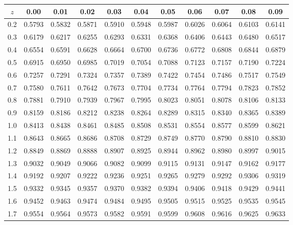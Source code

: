 \documentclass[11pt]{article}
\renewcommand{\arraystretch}{1.02}
\begin{document}
	
	\begin{center}
		\renewcommand{\arraystretch}{1.18}
		\setlength{\tabcolsep}{10.2pt}
		\begin{tabular}{|c|c|c|c|c|c|c|c|c|c|c|}
			\hline
			\rowcolor{gray!40}
			\(z\) & 0.00 & 0.01 & 0.02 & 0.03 & 0.04 & 0.05 & 0.06 & 0.07 & 0.08 & 0.09\\
			\hline
			0.2 & 0.5793 & 0.5832 & 0.5871 & 0.5910 & 0.5948 & 0.5987 & 0.6026 & 0.6064 & 0.6103 & 0.6141\\
			0.3 & 0.6179 & 0.6217 & 0.6255 & 0.6293 & 0.6331 & 0.6368 & 0.6406 & 0.6443 & 0.6480 & 0.6517\\
			0.4 & 0.6554 & 0.6591 & 0.6628 & 0.6664 & 0.6700 & 0.6736 & 0.6772 & 0.6808 & 0.6844 & 0.6879\\
			0.5 & 0.6915 & 0.6950 & 0.6985 & 0.7019 & 0.7054 & 0.7088 & 0.7123 & 0.7157 & 0.7190 & 0.7224\\
			0.6 & 0.7257 & 0.7291 & 0.7324 & 0.7357 & 0.7389 & 0.7422 & 0.7454 & 0.7486 & 0.7517 & 0.7549\\
			0.7 & 0.7580 & 0.7611 & 0.7642 & 0.7673 & 0.7704 & 0.7734 & 0.7764 & 0.7794 & 0.7823 & 0.7852\\
			0.8 & 0.7881 & 0.7910 & 0.7939 & 0.7967 & 0.7995 & 0.8023 & 0.8051 & 0.8078 & 0.8106 & 0.8133\\
			0.9 & 0.8159 & 0.8186 & 0.8212 & 0.8238 & 0.8264 & 0.8289 & 0.8315 & 0.8340 & 0.8365 & 0.8389\\
			1.0 & 0.8413 & 0.8438 & 0.8461 & 0.8485 & 0.8508 & 0.8531 & 0.8554 & 0.8577 & 0.8599 & 0.8621\\
			1.1 & 0.8643 & 0.8665 & 0.8686 & 0.8708 & 0.8729 & 0.8749 & 0.8770 & 0.8790 & 0.8810 & 0.8830\\
			1.2 & 0.8849 & 0.8869 & 0.8888 & 0.8907 & 0.8925 & 0.8944 & 0.8962 & 0.8980 & 0.8997 & 0.9015\\
			1.3 & 0.9032 & 0.9049 & 0.9066 & 0.9082 & 0.9099 & 0.9115 & 0.9131 & 0.9147 & 0.9162 & 0.9177\\
			1.4 & 0.9192 & 0.9207 & 0.9222 & 0.9236 & 0.9251 & 0.9265 & 0.9279 & 0.9292 & 0.9306 & 0.9319\\
			1.5 & 0.9332 & 0.9345 & 0.9357 & 0.9370 & 0.9382 & 0.9394 & 0.9406 & 0.9418 & 0.9429 & 0.9441\\
			1.6 & 0.9452 & 0.9463 & 0.9474 & 0.9484 & 0.9495 & 0.9505 & 0.9515 & 0.9525 & 0.9535 & 0.9545\\
			1.7 & 0.9554 & 0.9564 & 0.9573 & 0.9582 & 0.9591 & 0.9599 & 0.9608 & 0.9616 & 0.9625 & 0.9633\\

\end{tabular}
\end{center}
\end{document}
